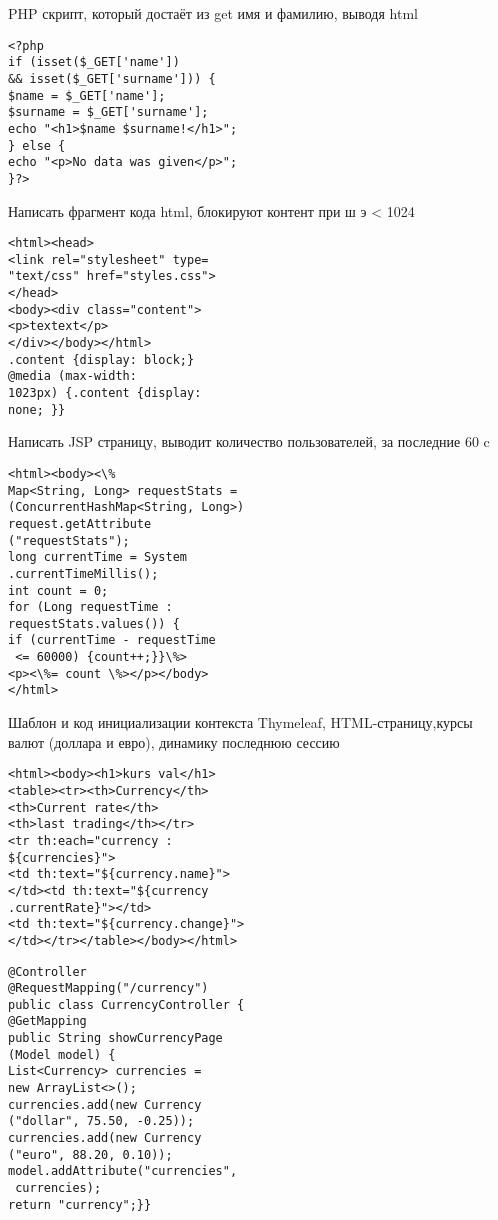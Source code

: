 \documentclass{article}
\begin{document}
\color{darkgray}
\tiny
\begin{minipage}{.2\textwidth}
PHP скрипт, который достаёт из get имя и фамилию, выводя html
\begin{lstlisting}
<?php
if (isset($_GET['name']) 
&& isset($_GET['surname'])) {
$name = $_GET['name'];
$surname = $_GET['surname'];
echo "<h1>$name $surname!</h1>";
} else {
echo "<p>No data was given</p>";
}?>
\end{lstlisting}
\end{minipage}
\hfill
\begin{minipage}{.2\textwidth}
    Написать фрагмент кода html, блокируют контент при ш э < 1024
\begin{lstlisting}
<html><head>
<link rel="stylesheet" type=
"text/css" href="styles.css">
</head>
<body><div class="content">
<p>textext</p>
</div></body></html>
.content {display: block;}
@media (max-width: 
1023px) {.content {display:
none; }}
\end{lstlisting}
\end{minipage}
\hfill
\begin{minipage}{.2\textwidth}
    Написать JSP страницу, выводит количество пользователей, за последние 60 c
\begin{lstlisting}
<html><body><\%
Map<String, Long> requestStats = 
(ConcurrentHashMap<String, Long>)
request.getAttribute
("requestStats");
long currentTime = System
.currentTimeMillis();
int count = 0;
for (Long requestTime :
requestStats.values()) {
if (currentTime - requestTime
 <= 60000) {count++;}}\%>
<p><\%= count \%></p></body>
</html>
\end{lstlisting}
\end{minipage}
\hfill
\begin{minipage}{.2\textwidth}
Шаблон и код инициализации контекста Thymeleaf, HTML-страницу,курсы валют (доллара и евро), динамику последнюю сессию
\begin{lstlisting}
<html><body><h1>kurs val</h1>
<table><tr><th>Currency</th>
<th>Current rate</th>
<th>last trading</th></tr>
<tr th:each="currency :
${currencies}">
<td th:text="${currency.name}">
</td><td th:text="${currency
.currentRate}"></td>
<td th:text="${currency.change}">
</td></tr></table></body></html>
\end{lstlisting}
\begin{lstlisting}
@Controller
@RequestMapping("/currency")
public class CurrencyController {
@GetMapping
public String showCurrencyPage
(Model model) {
List<Currency> currencies = 
new ArrayList<>();
currencies.add(new Currency
("dollar", 75.50, -0.25));
currencies.add(new Currency
("euro", 88.20, 0.10));
model.addAttribute("currencies",
 currencies);
return "currency";}}
\end{lstlisting}
\end{minipage}
\end{document}
